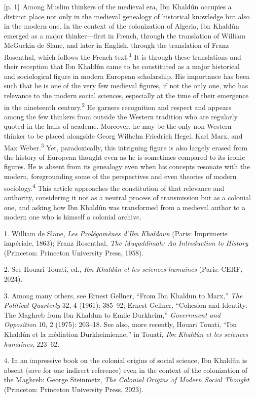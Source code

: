 \documentclass[10pt,a4paper]{article}
\begin{document}
{\scriptsize\color{gray} [p. 1]}\ Among Muslim thinkers of the medieval era, Ibn Khaldûn occupies a distinct place not only in the medieval genealogy of historical knowledge but also in the modern one. In the context of the colonization of Algeria, Ibn Khaldûn emerged as a major thinker—first in French, through the translation of William McGuckin de Slane, and later in English, through the translation of Franz Rosenthal, which follows the French text.\nobreak\textsuperscript{1} It is through these translations and their reception that Ibn Khaldûn came to be constituted as a major historical and sociological figure in modern European scholarship. His importance has been such that he is one of the very few medieval figures, if not the only one, who has relevance to the modern social sciences, especially at the time of their emergence in the nineteenth century.\nobreak\textsuperscript{2} He garners recognition and respect and appears among the few thinkers from outside the Western tradition who are regularly quoted in the halls of academe. Moreover, he may be the only non-Western thinker to be placed alongside Georg Wilhelm Friedrich Hegel, Karl Marx, and Max Weber.\nobreak\textsuperscript{3} Yet, paradoxically, this intriguing figure is also largely erased from the history of European thought even as he is sometimes compared to its iconic figures. He is absent from its genealogy even when his concepts resonate with the modern, foregrounding some of the perspectives and even theories of modern sociology.\nobreak\textsuperscript{4} This article approaches the constitution of that relevance and authority, considering it not as a neutral process of transmission but as a colonial one, and asking how Ibn Khaldûn was transformed from a medieval author to a modern one who is himself a colonial archive.\par{\small 1. William de Slane, \textit{Les Prolégomènes d’Ibn Khaldoun} (Paris: Imprimerie impériale, 1863); Franz Rosenthal, \textit{The Muqaddimah: An Introduction to History} (Princeton: Princeton University Press, 1958).\par}{\small 2. See Houari Touati, ed., \textit{Ibn Khaldûn et les sciences humaines} (Paris: CERF, 2024).\par}{\small 3. Among many others, see Ernest Gellner, “From Ibn Khaldun to Marx,” \textit{The Political Quarterly} 32, 4 (1961): 385–92; Ernest Gellner, “Cohesion and Identity: The Maghreb from Ibn Khaldun to Emile Durkheim,” \textit{Government and Opposition} 10, 2 (1975): 203–18. See also, more recently, Houari Touati, “Ibn Khaldûn et la médiation Durkheimienne,” in Touati\textit{, Ibn Khaldûn et les sciences humaines}, 223–62.\par}{\small 4. In an impressive book on the colonial origins of social science, Ibn Khaldûn is absent (save for one indirect reference) even in the context of the colonization of the Maghreb: George Steinmetz, \textit{The Colonial Origins of Modern Social Thought} (Princeton: Princeton University Press, 2023).\par}
\end{document}
